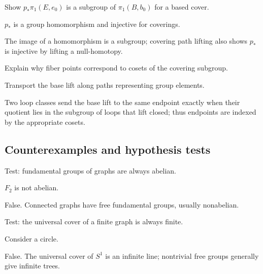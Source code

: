 \begin{exercise}\label{exr:viii14-ped-08}
Show $p_*\pi_1(E,e_0)$ is a subgroup of $\pi_1(B,b_0)$ for a based cover.
\end{exercise}
\begin{hint}
$p_*$ is a group homomorphism and injective for coverings.
\end{hint}
\begin{solution}
The image of a homomorphism is a subgroup; covering path lifting also shows $p_*$ is injective by lifting a null-homotopy.
\end{solution}

\begin{exercise}\label{exr:viii14-ped-09}
Explain why fiber points correspond to cosets of the covering subgroup.
\end{exercise}
\begin{hint}
Transport the base lift along paths representing group elements.
\end{hint}
\begin{solution}
Two loop classes send the base lift to the same endpoint exactly when their quotient lies in the subgroup of loops that lift closed; thus endpoints are indexed by the appropriate cosets.
\end{solution}

\subsection*{Counterexamples and hypothesis tests}

\begin{exercise}\label{exr:viii14-ped-10}
Test: fundamental groups of graphs are always abelian.
\end{exercise}
\begin{hint}
$F_2$ is not abelian.
\end{hint}
\begin{solution}
False. Connected graphs have free fundamental groups, usually nonabelian.
\end{solution}

\begin{exercise}\label{exr:viii14-ped-11}
Test: the universal cover of a finite graph is always finite.
\end{exercise}
\begin{hint}
Consider a circle.
\end{hint}
\begin{solution}
False. The universal cover of $S^1$ is an infinite line; nontrivial free groups generally give infinite trees.
\end{solution}

